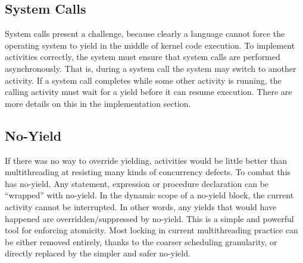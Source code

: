\documentclass[9pt,preprint]{sigplanconf}
\begin{document}







\subsection{System Calls}

System calls present a challenge, because clearly a language cannot force the operating system to yield in the middle of kernel code execution.
To implement activities correctly, the system must ensure that system calls are performed asynchronously.
That is, during a system call the system may switch to another activity.
If a system call completes while some other activity is running, the calling activity must wait for a yield before it can resume execution.
There are more details on this in the implementation section.

\subsection{No-Yield}
\label{sec:noyield}

If there was no way to override yielding, activities would be little better than multithreading at resisting many kinds of concurrency defects.
To combat this \charcoal{} has no-yield.
Any statement, expression or procedure declaration can be ``wrapped'' with no-yield.
In the dynamic scope of a no-yield block, the current activity cannot be interrupted.
In other words, any yields that would have happened are overridden/suppressed by no-yield.
This is a simple and powerful tool for enforcing atomicity.
Most locking in current multithreading practice can be either removed entirely, thanks to the coarser scheduling granularity, or directly replaced by the simpler and safer no-yield.
\end{document}
